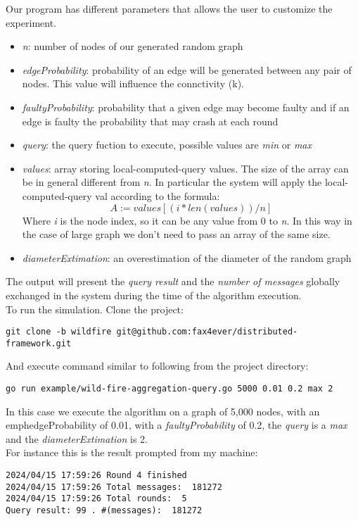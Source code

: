 \documentclass{article}
\begin{document}
Our program has different parameters that allows the user to customize the experiment.
\begin{itemize}
	\item \emph{n}: number of nodes of our generated random graph
	\item \emph{edgeProbability}: probability of an edge will be generated between any pair of nodes. This value will influence the connctivity (k).
	\item \emph{faultyProbability}: probability that a given edge may become faulty and if an edge is faulty the probability that may crash at each round
	\item \emph{query}: the query fuction to execute, possible values are \emph{min} or \emph{max}
	\item \emph{values}: array storing local-computed-query values. The size of the array can be in general different from \emph{n}. In particular the system will apply the local-computed-query val according to the formula: 
	\begin{equation}
	A := values[(i * len(values)) / n]
	\end{equation}
	Where \emph{i} is the node index, so it can be any value from 0 to \emph{n}. In this way in the case of large graph we don't need to pass an array of the same size.
	\item \emph{diameterExtimation}: an overestimation of the diameter of the random graph
\end{itemize}
The output will present the \emph{query result} and the \emph{number of messages} globally exchanged in the system during the time of the algorithm execution. \\
To run the simulation. Clone the project:
\begin{verbatim}
git clone -b wildfire git@github.com:fax4ever/distributed-framework.git
\end{verbatim}
And execute command similar to following from the project directory:
\begin{verbatim}
go run example/wild-fire-aggregation-query.go 5000 0.01 0.2 max 2
\end{verbatim}
In this case we execute the algorithm on a graph of 5,000 nodes, with an emph{edgeProbability} of 0.01, with a \emph{faultyProbability} of 0.2, the \emph{query} is a \emph{max} and the \emph{diameterExtimation} is 2. \\
For instance this is the result prompted from my machine:
\begin{verbatim}
2024/04/15 17:59:26 Round 4 finished
2024/04/15 17:59:26 Total messages:  181272
2024/04/15 17:59:26 Total rounds:  5
Query result: 99 . #(messages):  181272
\end{verbatim}
\end{document}
